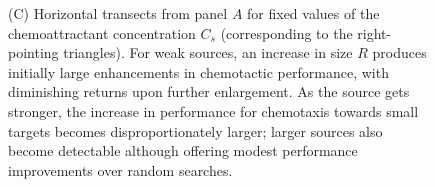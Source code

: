 \documentclass[9pt,twocolumn,twoside]{pnas-new}
\begin{document}
\begin{figure}
{        %
        (C) Horizontal transects from panel $A$ for fixed values of the chemoattractant concentration $C_s$ (corresponding to the right-pointing triangles).
        For weak sources, an increase in size $R$ produces initially large enhancements in chemotactic performance, with diminishing returns upon further enlargement.
        As the source gets stronger, the increase in performance for chemotaxis towards small targets becomes disproportionately larger; larger sources also become detectable although offering modest performance improvements over random searches.
    }
    \label{fig:asymmetric-performance}
\end{figure}
\end{document}
